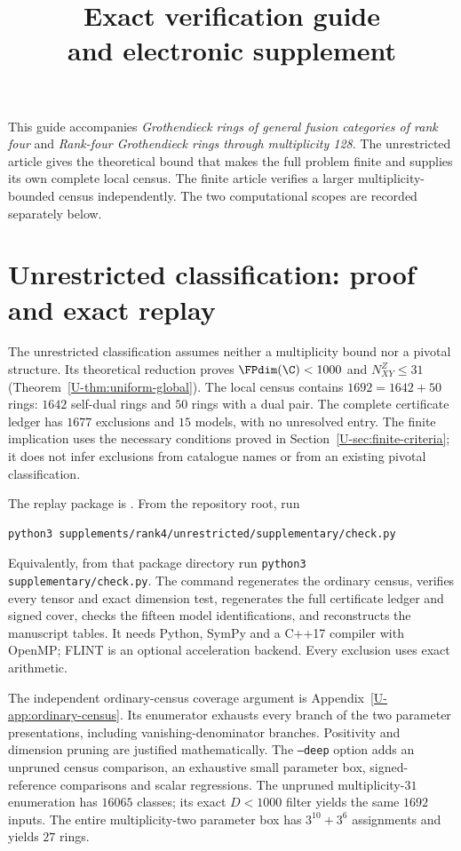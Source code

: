 \documentclass[11pt]{article}
\title{Exact verification guide\\and electronic supplement}
\date{}
\begin{document}
\maketitle
\ResearchNotice

This guide accompanies \emph{Grothendieck rings of general fusion categories of rank four} and \emph{Rank-four Grothendieck rings
through multiplicity 128}. The unrestricted article gives the theoretical
bound that makes the full problem finite and supplies its own complete
local census. The finite article verifies a larger multiplicity-bounded
census independently. The two computational scopes are recorded
separately below.

\section{Unrestricted classification: proof and exact replay}
The unrestricted classification assumes neither a multiplicity bound nor
a pivotal structure. Its theoretical reduction proves
$\FPdim(\C)<1000$ and $N_{XY}^{Z}\le31$
(Theorem~\ref{U-thm:uniform-global}). The local census contains
$1692=1642+50$ rings: $1642$ self-dual rings and $50$ rings with a dual
pair. The complete certificate ledger has $1677$ exclusions and $15$
models, with no unresolved entry. The finite implication uses the
necessary conditions proved in Section~\ref{U-sec:finite-criteria}; it
does not infer exclusions from catalogue names or from an existing
pivotal classification.

The replay package is . From the
repository root, run
\begin{verbatim}
python3 supplements/rank4/unrestricted/supplementary/check.py
\end{verbatim}
Equivalently, from that package directory run
\texttt{python3 supplementary/check.py}. The command regenerates the
ordinary census, verifies every tensor and exact dimension test,
regenerates the full certificate ledger and signed cover, checks the
fifteen model identifications, and reconstructs the manuscript tables.
It needs Python, SymPy and a C++17 compiler with OpenMP; FLINT is an
optional acceleration backend. Every exclusion uses exact arithmetic.

The independent ordinary-census coverage argument is
Appendix~\ref{U-app:ordinary-census}. Its enumerator exhausts every branch
of the two parameter presentations, including vanishing-denominator
branches. Positivity and dimension pruning are justified mathematically.
The \texttt{--deep} option adds an unpruned census comparison, an exhaustive
small parameter box, signed-reference comparisons and scalar regressions.
The unpruned multiplicity-$31$ enumeration has $16065$ classes; its exact
$D<1000$ filter yields the same $1692$ inputs. The entire multiplicity-two
parameter box has $3^{10}+3^6$ assignments and yields $27$ rings.
\end{document}
